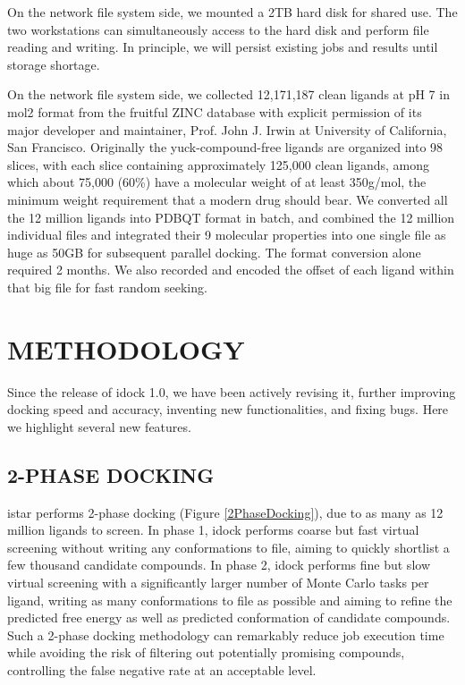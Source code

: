 \documentclass[12pt]{article}
\begin{document}
On the network file system side, we mounted a 2TB hard disk for shared use. The two workstations can simultaneously access to the hard disk and perform file reading and writing. In principle, we will persist existing jobs and results until storage shortage.

On the network file system side, we collected 12,171,187 clean ligands at pH 7 in mol2 format from the fruitful ZINC database \citep{532,1178} with explicit permission of its major developer and maintainer, Prof. John J. Irwin at University of California, San Francisco. Originally the yuck-compound-free ligands are organized into 98 slices, with each slice containing approximately 125,000 clean ligands, among which about 75,000 (60\%) have a molecular weight of at least 350g/mol, the minimum weight requirement that a modern drug should bear. We converted all the 12 million ligands into PDBQT format in batch, and combined the 12 million individual files and integrated their 9 molecular properties into one single file as huge as 50GB for subsequent parallel docking. The format conversion alone required 2 months. We also recorded and encoded the offset of each ligand within that big file for fast random seeking.

\section*{\sffamily \Large METHODOLOGY}

Since the release of idock 1.0, we have been actively revising it, further improving docking speed and accuracy, inventing new functionalities, and fixing bugs. Here we highlight several new features.

\subsection*{\sffamily \large 2-PHASE DOCKING}

istar performs 2-phase docking (Figure \ref{2PhaseDocking}), due to as many as 12 million ligands to screen. In phase 1, idock performs coarse but fast virtual screening without writing any conformations to file, aiming to quickly shortlist a few thousand candidate compounds. In phase 2, idock performs fine but slow virtual screening with a significantly larger number of Monte Carlo tasks per ligand, writing as many conformations to file as possible and aiming to refine the predicted free energy as well as predicted conformation of candidate compounds. Such a 2-phase docking methodology can remarkably reduce job execution time while avoiding the risk of filtering out potentially promising compounds, controlling the false negative rate at an acceptable level.
\end{document}
